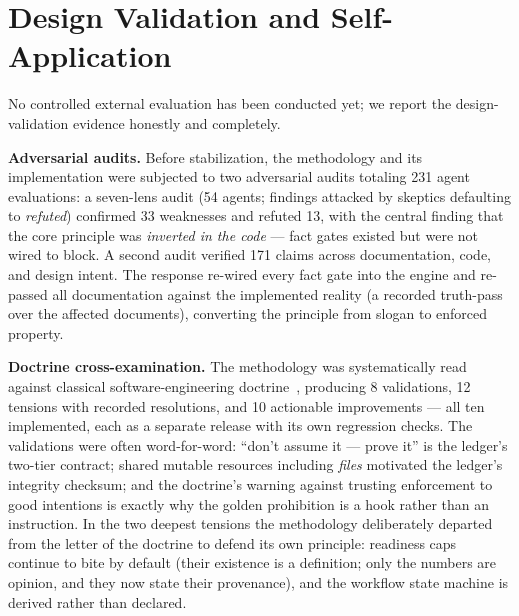 \documentclass[11pt]{article}
\begin{document}
\section{Design Validation and Self-Application}\label{sec:validation}

No controlled external evaluation has been conducted yet; we report the
design-validation evidence honestly and completely.

\textbf{Adversarial audits.} Before stabilization, the methodology and its
implementation were subjected to two adversarial audits totaling 231 agent
evaluations: a seven-lens audit (54 agents; findings attacked by skeptics
defaulting to \emph{refuted}) confirmed 33 weaknesses and refuted 13, with the
central finding that the core principle was \emph{inverted in the code} ---
fact gates existed but were not wired to block. A second audit verified 171
claims across documentation, code, and design intent. The response re-wired
every fact gate into the engine and re-passed all documentation against the
implemented reality (a recorded truth-pass over the affected documents),
converting the principle from slogan to enforced property.

\textbf{Doctrine cross-examination.} The methodology was systematically read
against classical software-engineering doctrine~\cite{thomas2019pragmatic},
producing 8 validations, 12 tensions with recorded resolutions, and 10
actionable improvements --- all ten implemented, each as a separate release
with its own regression checks. The validations were often word-for-word:
``don't assume it --- prove it'' is the ledger's two-tier contract; shared
mutable resources including \emph{files} motivated the ledger's integrity
checksum; and the doctrine's warning against trusting enforcement to good
intentions is exactly why the golden prohibition is a hook rather than an
instruction. In the two deepest tensions the methodology
deliberately departed from the letter of the doctrine to defend its own
principle: readiness caps continue to bite by default (their existence is a
definition; only the numbers are opinion, and they now state their
provenance), and the workflow state machine is derived rather than declared.
\end{document}
